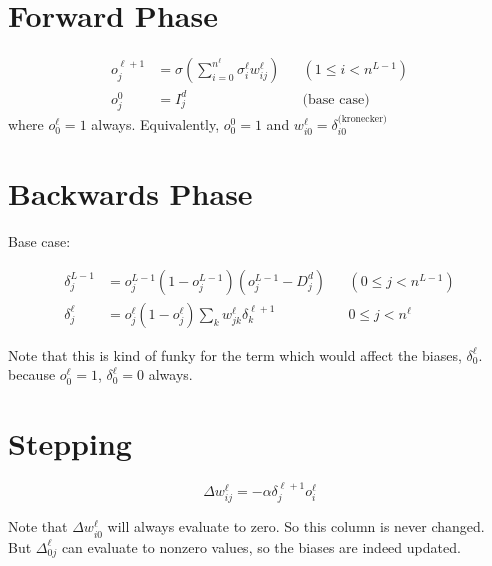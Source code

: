\documentclass[letterpaper]{article}
\begin{document}
\section{Forward Phase}

\begin{align*}
o_j^{\ell+1}&=\sigma\left(\sum_{i=0}^{n^\ell} \sigma_i^{\ell} w_{ij}^\ell\right) & & (1\leq i < n^{L-1})\\
o_j^{0}&=I_j^d& & \text{(base case)}
\end{align*}
where $o^\ell_0=1$ always. Equivalently, $o_0^0=1$ and $w_{i 0}^\ell=\delta_{i 0}^{\text{(kronecker)}}$

\section{Backwards Phase}

Base case:

\begin{align*}
    \delta_j^{L-1}&=o_j^{L-1}(1-o_j^{L-1})(o_j^{L-1}-D_j^d) & & (0\leq j < n^{L-1})\\
    \delta_j^\ell&=o_j^\ell(1-o_j^\ell)\sum_k w_{jk}^{\ell}\delta_k^{\ell+1} & & 0 \leq j < n^\ell
\end{align*}

Note that this is kind of funky for the term which would affect the biases, $\delta_0^\ell$. because 
$o_0^\ell=1$, $\delta_0^\ell=0$ always.

\section{Stepping}
$$\Delta w_{ij}^{\ell}=-\alpha \delta_j^{\ell+1} o_i^{\ell}$$

Note that $\Delta w_{i0}^\ell$ will always evaluate to zero. So this column is never changed.
But $\Delta_{0 j}^\ell$ can evaluate to nonzero values, so the biases are indeed updated.
\end{document}

